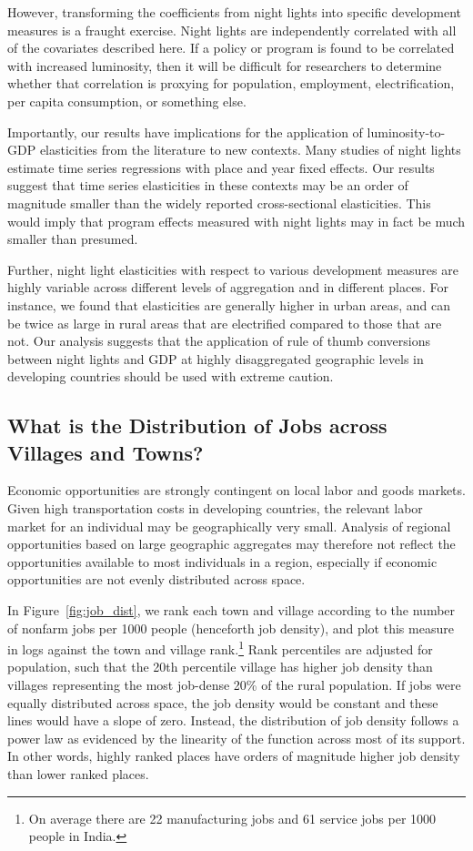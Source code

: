 \documentclass[12pt,letterpaper]{article}
\begin{document}
However, transforming the coefficients from night lights into specific
development measures is a fraught exercise. Night lights are
independently correlated with all of the covariates described here. If
a policy or program is found to be correlated with increased
luminosity, then it will be difficult for researchers to determine
whether that correlation is proxying for population, employment,
electrification, per capita consumption, or something else.

Importantly, our results have implications for the application of
luminosity-to-GDP elasticities from the literature to new
contexts. Many studies of night lights estimate time series
regressions with place and year fixed effects. Our results suggest
that time series elasticities in these contexts may be an order of
magnitude smaller than the widely reported cross-sectional
elasticities. This would imply that program effects measured with
night lights may in fact be much smaller than presumed.

Further, night light elasticities with respect to various development
measures are highly variable across different levels of aggregation
and in different places. For instance, we found that elasticities are
generally higher in urban areas, and can be twice as large in rural
areas that are electrified compared to those that are not. Our
analysis suggests that the application of rule of thumb conversions
between night lights and GDP at highly disaggregated geographic levels
in developing countries should be used with extreme caution.

\subsection*{What is the Distribution of Jobs across Villages and Towns?}

Economic opportunities are strongly contingent on local labor and goods markets. Given high transportation costs in developing countries, the relevant labor market for an individual may be geographically very small. Analysis of regional opportunities based on large geographic aggregates may therefore not reflect the opportunities available to most individuals in a region, especially if economic opportunities are not evenly distributed across space.

In Figure~\ref{fig:job_dist}, we rank each town and village according to the number of nonfarm jobs per 1000 people (henceforth job density), and plot this measure in logs against the town and village rank.\footnote{On average there are 22 manufacturing jobs and 61 service jobs per 1000 people in India.} Rank percentiles are adjusted for population, such that the 20th percentile village has higher job density than villages representing the most job-dense 20\% of the rural population. If jobs were equally distributed across space, the job density would be constant and these lines would have a slope of zero. Instead, the distribution of job density follows a power law as evidenced by the linearity of the function across most of its support. In other words, highly ranked places have orders of magnitude higher job density than lower ranked places.
\end{document}
